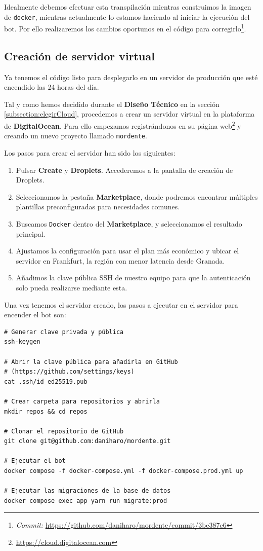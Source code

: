 Idealmente debemos efectuar esta transpilación mientras construimos la imagen de \texttt{docker}, mientras actualmente lo estamos haciendo al iniciar la ejecución del bot. Por ello realizaremos los cambios oportunos en el código para corregirlo\footnote{\textit{Commit:} \url{https://github.com/daniharo/mordente/commit/3be387e6}}.


\subsection{Creación de servidor virtual}

Ya tenemos el código listo para desplegarlo en un servidor de producción que esté encendido las 24 horas del día.

Tal y como hemos decidido durante el \textbf{Diseño Técnico} en la sección \ref{subsection:elegirCloud}, procedemos a crear un servidor virtual en la plataforma de \textbf{DigitalOcean}. Para ello empezamos registrándonos en su página web\footnote{\url{https://cloud.digitalocean.com}} y creando un nuevo proyecto llamado \texttt{mordente}.

Los pasos para crear el servidor han sido los siguientes:

\begin{enumerate}
    \item Pulsar \textbf{Create} y \textbf{Droplets}. Accederemos a la pantalla de creación de Droplets.
    \item Seleccionamos la pestaña \textbf{Marketplace}, donde podremos encontrar múltiples plantillas preconfiguradas para necesidades comunes.
    \item Buscamos \texttt{Docker} dentro del \textbf{Marketplace}, y seleccionamos el resultado principal.
    \item Ajustamos la configuración para usar el plan más económico y ubicar el servidor en Frankfurt, la región con menor latencia desde Granada.
    \item Añadimos la clave pública SSH de nuestro equipo para que la autenticación solo pueda realizarse mediante esta.
\end{enumerate}

Una vez tenemos el servidor creado, los pasos a ejecutar en el servidor para encender el bot son:

\begin{verbatim}
# Generar clave privada y pública
ssh-keygen

# Abrir la clave pública para añadirla en GitHub
# (https://github.com/settings/keys)
cat .ssh/id_ed25519.pub

# Crear carpeta para repositorios y abrirla
mkdir repos && cd repos

# Clonar el repositorio de GitHub
git clone git@github.com:daniharo/mordente.git

# Ejecutar el bot
docker compose -f docker-compose.yml -f docker-compose.prod.yml up

# Ejecutar las migraciones de la base de datos
docker compose exec app yarn run migrate:prod
\end{verbatim}

